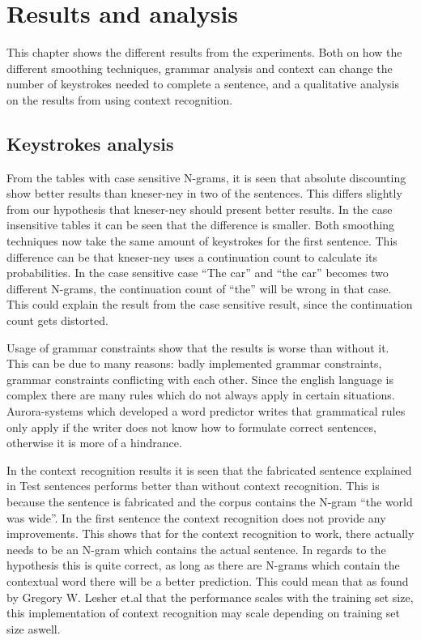 \section{Results and analysis}
This chapter shows the different results from the experiments. Both on how the different smoothing techniques, grammar analysis and context can change the number of keystrokes needed to complete a sentence, and a qualitative analysis on the results from using context recognition.

\subsection{Keystrokes analysis}
From the tables with case sensitive N-grams, it is seen that absolute discounting show better results than kneser-ney in two of the sentences. This differs slightly from our hypothesis that kneser-ney should present better results. In the case insensitive tables it can be seen that the difference is smaller. Both smoothing techniques now take the same amount of keystrokes for the first sentence. This difference can be that kneser-ney uses a continuation count to calculate its probabilities. In the case sensitive case “The car” and “the car” becomes two different N-grams, the continuation count of “the” will be wrong in that case. This could explain the result from the case sensitive result, since the continuation count gets distorted. 

Usage of grammar constraints show that the results is worse than without it. This can be due to many reasons: badly implemented grammar constraints, grammar constraints conflicting with each other. Since the english language is complex there are many rules which do not always apply in certain situations. Aurora-systems which developed a word predictor writes that grammatical rules only apply if the writer does not know how to formulate correct sentences, otherwise it is more of a hindrance\cite{aurora}.

In the context recognition results it is seen that the fabricated sentence explained in Test sentences performs better than without context recognition. This is because the sentence is fabricated and the corpus contains the N-gram “the world was wide”. In the first sentence the context recognition does not provide any improvements. This shows that for the context recognition to work, there actually needs to be an N-gram which contains the actual sentence. In regards to the hypothesis this is quite correct, as long as there are N-grams which contain the contextual word there will be a better prediction. This could mean that as found by Gregory W. Lesher et.al that the performance scales with the training set size\cite{Lesher99effectsof}, this implementation of context recognition may scale depending on training set size aswell.
\vspace{1em}
